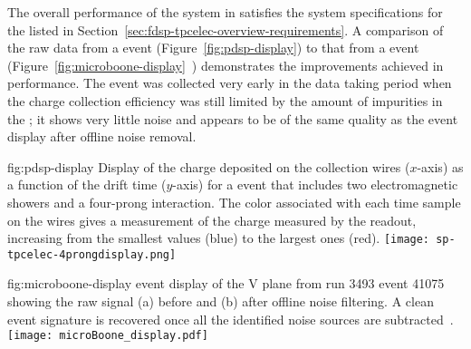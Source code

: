 The overall performance of the  system in 
 satisfies the %
 system specifications %
for the  %
listed in Section~\ref{sec:fdsp-tpcelec-overview-requirements}. 
%
A comparison of the raw data from 
a  event (Figure~\ref{fig:pdsp-display}) to 
that from a  event (Figure~\ref{fig:microboone-display}~\cite{Acciarri:2017sde}) demonstrates the improvements achieved in  performance. 
The  event was collected very early in the data taking
period when the charge collection efficiency was still limited
by the amount of impurities in the ; it shows very little
noise and appears to be of the same quality as the 
event display after offline noise removal. 


\begin{dunefigure}
{fig:pdsp-display}
{Display of the charge deposited on the collection wires ($x$-axis) as
a function of the drift time ($y$-axis) for a  event 
that includes two electromagnetic showers and a four-prong interaction.
The color associated with each time sample on the 
wires gives a measurement of the charge measured by the 
readout, increasing from the smallest values (blue) to the largest
ones (red).}
\texttt{[image: sp-tpcelec-4prongdisplay.png]}
\end{dunefigure}

\begin{dunefigure}
{fig:microboone-display}
{ \twod event display of the V plane from run 3493 
event 41075 showing the raw signal (a) before and (b) after offline 
noise filtering. A clean event signature is recovered once all the 
identified noise sources are subtracted~\cite{Acciarri:2017sde}.}
\texttt{[image: microBoone\_display.pdf]}
\end{dunefigure}

